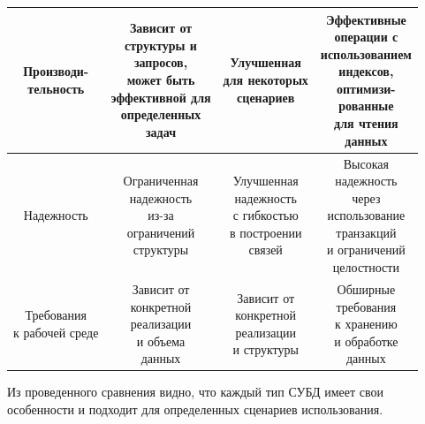 \begin{table}[h]
\begin{center}
\begin{threeparttable}
\begin{tabular}{|c|c|c|c|}
				\hline \makecell{Производи-\\тельность} &\makecell{Зависит от\\структуры и\\запросов,\\может быть\\эффективной для\\определенных\\задач}&\makecell{Улучшенная\\для некоторых\\сценариев}&\makecell{Эффективные\\операции с\\использованием\\индексов,\\ оптимизи-\\рованные\\для чтения\\данных} \\
				\hline Надежность &\makecell{Ограниченная\\надежность\\из-за\\ограничений\\ структуры}&\makecell{Улучшенная\\надежность\\с гибкостью\\в построении\\ связей}&\makecell{Высокая\\надежность\\через\\использование\\транзакций\\и ограничений\\ целостности}\\
				\hline \makecell{Требования\\к рабочей среде} &\makecell{Зависит от\\конкретной\\реализации\\и объема\\данных}&\makecell{Зависит от\\конкретной\\реализации\\и структуры}&\makecell{Обширные\\ требования\\к хранению\\и обработке\\данных}\\\hline
			\end{tabular}
		\end{threeparttable}
	\end{center}
\end{table}
\clearpage
Из проведенного сравнения видно, что каждый тип СУБД имеет свои особенности и подходит для определенных сценариев использования.

